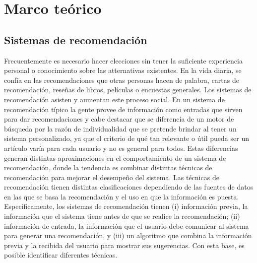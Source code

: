 \chapter {Marco teórico}
 \section{Sistemas de recomendación}
 	Frecuentemente es necesario hacer elecciones sin tener la suficiente experiencia personal o conocimiento sobre las atternativas existentes. En la vida diaria, se confía en las recomendaciones que otras personas hacen de palabra, cartas de recomendación, reseñas de libros, películas o encuestas generales. \cite{4}
 	Los sistemas de recomendación asisten y aumentan este proceso social. En un sistema de recomendación típico la gente provee de información como entradas que sirven para dar recomendaciones y cabe destacar que se diferencía de un motor de búsqueda por la razón de individualidad que se pretende brindar al tener un sistema personalizado, ya que el criterio de qué tan relevante o útil pueda ser un artículo varía para cada usuario y no es general para todos. Estas diferencias generan distintas aproximaciones en el comportamiento de un sistema de recomendación, donde la tendencia es combinar distintas técnicas de recomendación para mejorar el desempeño del sistema. Las técnicas de recomendación tienen distintas clasificaciones dependiendo de las fuentes de datos en las que se basa la recomendación y el uso en que la información es puesta. Especificamente, los sistemas de recomendación tienen (i) información previa, la información que el sistema tiene antes de que se realice la recomendación; (ii) información de entrada, la información que el usuario debe comunicar al sistema para generar una recomendación, y (iii) un algoritmo que combina la información previa y la recibida del usuario para mostrar sus sugerencias. Con esta base, es posible identificar diferentes técnicas.%

